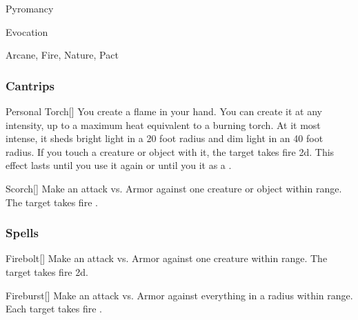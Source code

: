 \newpage
\begin{spellsection}{Pyromancy}

\begin{spellheader}
\end{spellheader}


 Evocation

 Arcane, Fire, Nature, Pact

\subsubsection{Cantrips}


\begin{freeability}{Personal Torch}[]
You create a flame in your hand.
You can create it at any intensity, up to a maximum heat equivalent to a burning torch.
At it most intense, it sheds bright light in a 20 foot radius and dim light in an 40 foot radius.
If you touch a creature or object with it, the target takes fire  \minus2d.
This effect lasts until you use it again or until you  it as a .
\end{freeability}


\begin{freeability}{Scorch}[]
Make an attack vs. Armor against one creature or object within \rngmed range.
\hit The target takes fire .
\end{freeability}

\end{spellsection}


\subsubsection{Spells}


\lowercase{\hypertarget{spell:Firebolt}{}}\label{spell:Firebolt}
\begin{apability}[\nth{1}]{\hypertarget{spell:Firebolt}{Firebolt}}[]
Make an attack vs. Armor against one creature within \rngmed range.
\hit The target takes fire  \plus2d.
\end{apability}
\vspace{0.25em}



\lowercase{\hypertarget{spell:Fireburst}{}}\label{spell:Fireburst}
\begin{apability}[\nth{1}]{\hypertarget{spell:Fireburst}{Fireburst}}[]
Make an attack vs. Armor against everything in a \areasmall radius within \rngmed range.
\hit Each target takes fire .
\end{apability}
\vspace{0.25em}



